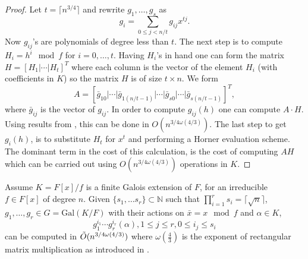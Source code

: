 \begin{proof}
Let $t = \lceil n^{3/4} \rceil$ and rewrite $g_1 , \ldots , g_s$ as 
$$g_i = \sum_{0 \leq j < n/t} g_{ij}x^{tj}.$$
Now $g_{ij}$'s are polynomials of degree less than $t$. The next step is to compute $H_i = h^i \mod f$ for $i = 0 , \ldots , t$.
Having $H_i$'s in hand one can form the matrix $H = \left[ H_1 \vert \cdots \vert H_t \right]^T$ where each column is the vector of 
the element $H_i$ (with coefficients in $K$) so the matrix $H$ is of size $t \times n$. We form 
$$A = \left[\bar{g}_{10}\vert \cdots \vert \bar{g}_{1(n/t-1)}\vert \cdots \vert \bar{g}_{s0}\vert \cdots \vert \bar{g}_{s(n/t-1)}\right]^T,$$
where $\bar{g}_{ij}$ is the  vector of $g_{ij}$. In order to compute $g_{ij}(h)$ one can compute $A \cdot H$. Using 
results from \cite{LeGall}, this can be done in $O(n^{3/4 \omega(4/3)})$. The last step to get $g_i(h)$, is to substitute $H_t$ 
for $x^t$ and performing a Horner evaluation scheme. The dominant term in the cost of this calculation, is the cost of computing $AH$ which can be carried out using $O(n^{3/4 \omega(4/3)})$ operations in $K$.
\end{proof}

\begin{lemma}\cite{Kaltofen}\label{lem:selfcomp}
Assume $K = F[x]/f$ is a finite Galois extension of $F$, for an irreducible $f\in F[x]$ of degree $n $. Given 
$\lbrace s_1, \ldots s_r \rbrace \subset \mathbb{N}$
such that $\prod_{i = 1}^r s_i = \lceil\sqrt{n}\rceil$, $g_1, \ldots , g_{r} \in G = \mathrm{Gal}(K/F)$ with their actions on 
$\bar{x}=x \mod f$ and $\alpha \in K$,
$$g_1^{i_1}\cdots g_r^{i_r}(\alpha) , 1 \leq j \leq r, 
0 \leq i_j \leq s_i$$ can be 
computed in $\tilde{O}(n^{3/4 \omega(4/3)})$ where $\omega(\frac{4}{3})$ is the exponent of rectangular matrix 
multiplication as introduced in \cite{LeGall}. 
\end{lemma}

